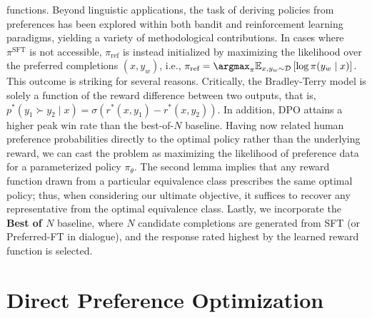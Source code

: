 functions. Beyond linguistic applications, the task of deriving policies from preferences has been explored within both bandit and reinforcement learning paradigms, yielding a variety of methodological contributions. In cases where $\pi^\text{SFT}$ is not accessible, $\pi_\text{ref}$ is instead initialized by maximizing the likelihood over the preferred completions ${(x, y_w)}$, i.e., ${\pi_\text{ref} = \argmax_{\pi}\mathbb{E}_{x, y_w \sim \mathcal{D}}\left[\log \pi(y_w \mid x)\right]}$. This outcome is striking for several reasons. Critically, the Bradley-Terry model is solely a function of the reward difference between two outputs, that is, ${p^*(y_1 \succ y_2 \mid x) = \sigma(r^*(x, y_1) - r^*(x, y_2))}$. In addition, DPO attains a higher peak win rate than the best-of-$N$ baseline. Having now related human preference probabilities directly to the optimal policy rather than the underlying reward, we can cast the problem as maximizing the likelihood of preference data for a parameterized policy $\pi_\theta$. The second lemma implies that any reward function drawn from a particular equivalence class prescribes the same optimal policy; thus, when considering our ultimate objective, it suffices to recover any representative from the optimal equivalence class. Lastly, we incorporate the \textbf{Best of $N$} baseline, where $N$ candidate completions are generated from SFT (or Preferred-FT in dialogue), and the response rated highest by the learned reward function is selected. \section{Direct Preference Optimization}\label{sec:DPO}

